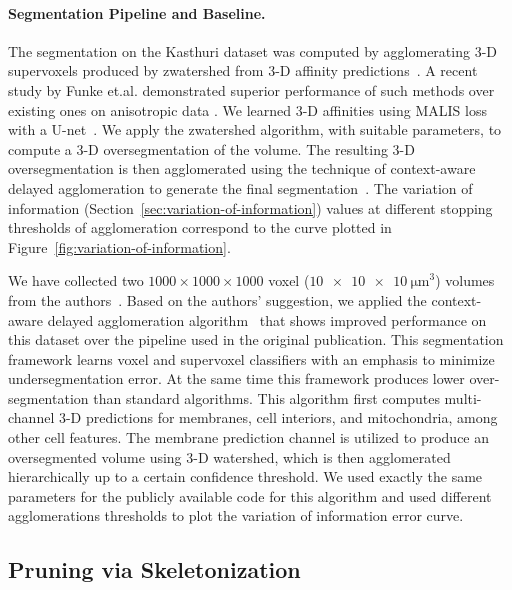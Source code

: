 \paragraph{Segmentation Pipeline and Baseline.}
\label{sec:neuroproof}
The segmentation on the Kasthuri dataset was computed by agglomerating 3-D supervoxels produced by zwatershed from 3-D affinity predictions~\cite{zlateski2015image}. 
A recent study by Funke et.al. demonstrated superior performance of such methods over existing ones on anisotropic data \cite{schlegel2017learning}. 
We learned 3-D affinities using MALIS loss with a U-net~\cite{Turaga:2009,ronneberger2015u}. 
We apply the zwatershed algorithm, with suitable parameters, to compute a 3-D oversegmentation of the volume. 
The resulting 3-D oversegmentation is then agglomerated using the technique of context-aware delayed agglomeration to generate the final segmentation~\cite{10.1371/journal.pone.0125825}. 
The variation of information (Section~\ref{sec:variation-of-information}) values at different stopping thresholds of agglomeration correspond to the curve plotted in Figure~\ref{fig:variation-of-information}.

We have collected two $1000 \times 1000 \times 1000$ voxel ($\SI[product-units=single]{10x10x10}{\micro\meter}^3$) volumes from the authors~\cite{takemura2017connectome}. 
Based on the authors' suggestion, we applied the context-aware delayed agglomeration algorithm~\cite{10.1371/journal.pone.0125825} that shows improved performance on this dataset over the pipeline used in the original publication. 
This segmentation framework learns voxel and supervoxel classifiers with an emphasis to minimize undersegmentation error.
At the same time this framework produces lower over-segmentation than standard algorithms. 
This algorithm first computes multi-channel 3-D predictions for membranes, cell interiors, and mitochondria, among other cell features. 
The membrane prediction channel is utilized to produce an oversegmented volume using 3-D watershed, which is then agglomerated hierarchically up to a certain confidence threshold. 
We used exactly the same parameters for the publicly available code for this algorithm and used different agglomerations thresholds to plot the variation of information error curve.

\subsection{Pruning via Skeletonization}

